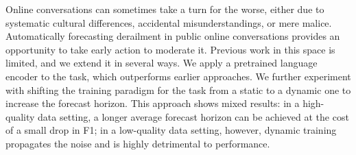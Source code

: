 Online conversations can sometimes take a turn for the worse, either due to systematic cultural differences, accidental misunderstandings, or mere malice. Automatically forecasting derailment in public online conversations provides an opportunity to take early action to moderate it. Previous work in this space is limited, and we extend it in several ways. We apply a pretrained language encoder to the task, which outperforms earlier approaches. We further experiment with shifting the training paradigm for the task from a static to a dynamic one to increase the forecast horizon. This approach shows mixed results: in a high-quality data setting, a longer average forecast horizon can be achieved at the cost of a small drop in F1; in a low-quality data setting, however, dynamic training propagates the noise and is highly detrimental to performance.
